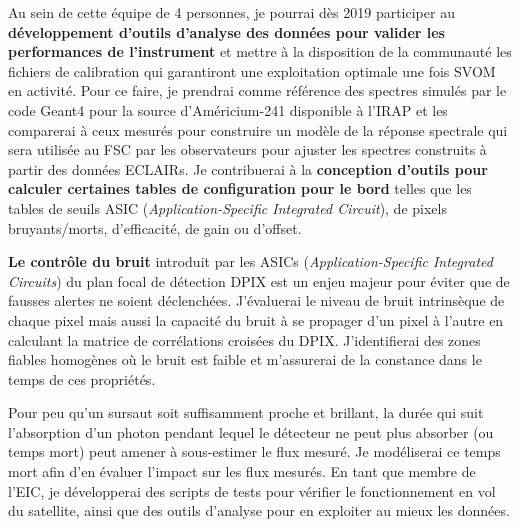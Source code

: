 \documentclass[12pt,onecolumn]{article}
\begin{document}
Au sein de cette équipe de 4 personnes, je pourrai dès 2019 participer au \textbf{développement d'outils d'analyse des données pour valider les performances de l'instrument} et mettre à la disposition de la communauté les fichiers de calibration qui garantiront une exploitation optimale une fois SVOM en activité. Pour ce faire, je prendrai comme référence des spectres simulés par le code Geant4 pour la source d'Américium-241 disponible à l'IRAP et les comparerai à ceux mesurés pour construire un modèle de la réponse spectrale qui sera utilisée au FSC par les observateurs pour ajuster les spectres construits à partir des données ECLAIRs. Je contribuerai à la \textbf{conception d'outils pour calculer certaines tables de configuration pour le bord} telles que les tables de seuils ASIC (\textit{Application-Specific Integrated Circuit}), de pixels bruyants/morts, d'efficacité, de gain ou d'offset.

\textbf{Le contrôle du bruit} introduit par les ASICs (\textit{Application-Specific Integrated Circuits}) du plan focal de détection DPIX est un enjeu majeur pour éviter que de fausses alertes ne soient déclenchées. J'évaluerai le niveau de bruit intrinsèque de chaque pixel mais aussi la capacité du bruit à se propager d'un pixel à l'autre en calculant la matrice de corrélations croisées du DPIX. J'identifierai des zones fiables homogènes où le bruit est faible et m'assurerai de la constance dans le temps de ces propriétés.


Pour peu qu'un sursaut soit suffisamment proche et brillant, la durée qui suit l'absorption d'un photon pendant lequel le détecteur ne peut plus absorber (ou temps mort) peut amener à sous-estimer le flux mesuré. Je modéliserai ce temps mort afin d'en évaluer l'impact sur les flux mesurés. En tant que membre de l'EIC, je développerai des scripts de tests pour vérifier le fonctionnement en vol du satellite, ainsi que des outils d'analyse pour en exploiter au mieux les données. 




\end{document}
